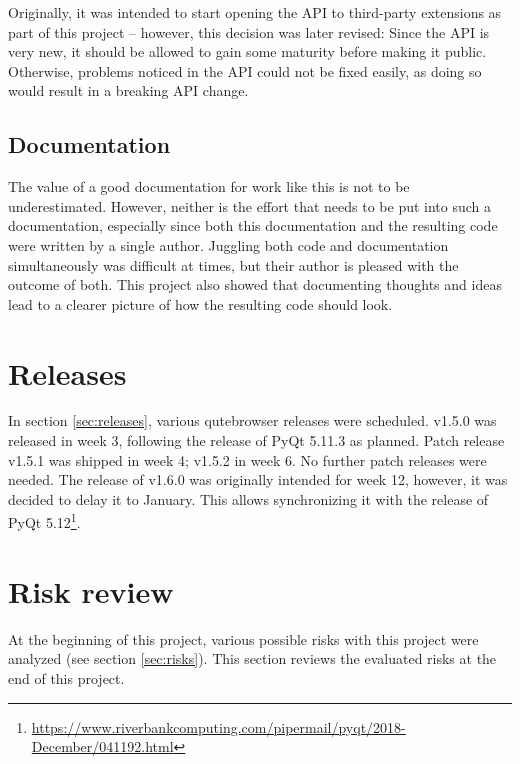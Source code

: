 Originally, it was intended to start opening the API to third-party extensions
as part of this project -- however, this decision was later revised: Since the
API is very new, it should be allowed to gain some maturity before making it
public. Otherwise, problems noticed in the API could not be fixed easily, as
doing so would result in a breaking API change.

\subsection{Documentation}

The value of a good documentation for work like this is not to be
underestimated. However, neither is the effort that needs to be put into such a
documentation, especially since both this documentation and the resulting code
were written by a single author. Juggling both code and documentation
simultaneously was difficult at times, but their author is pleased with the
outcome of both. This project also showed that documenting thoughts and ideas
lead to a clearer picture of how the resulting code should look.

\section{Releases}
In section \ref{sec:releases}, various qutebrowser releases were scheduled.
v1.5.0 was released in week 3, following the release of PyQt 5.11.3 as planned.
Patch release v1.5.1 was shipped in week 4; v1.5.2 in week 6. No further patch
releases were needed. The release of v1.6.0 was originally intended for week 12,
however, it was decided to delay it to January. This allows synchronizing it
with the release of PyQt 5.12\footnote{\url{https://www.riverbankcomputing.com/pipermail/pyqt/2018-December/041192.html}}.

\section{Risk review}
At the beginning of this project, various possible risks with this project were
analyzed (see section \ref{sec:risks}). This section reviews the evaluated
risks at the end of this project.

